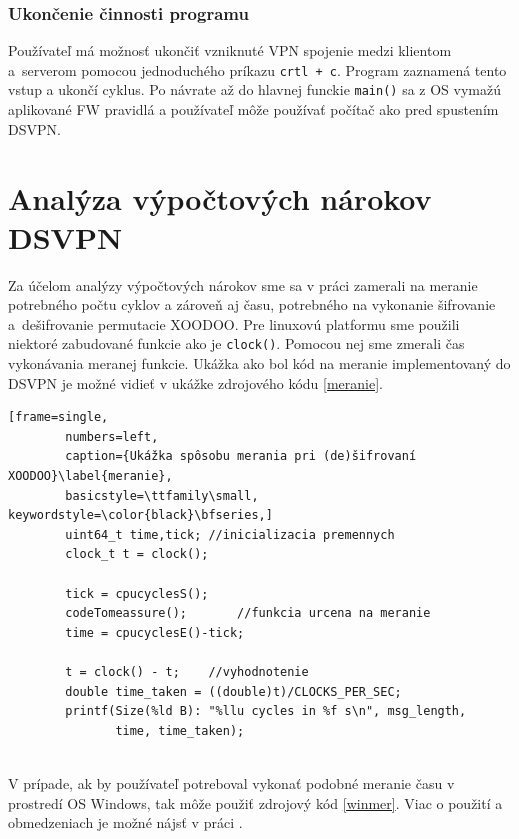   
\subsubsection{Ukončenie činnosti programu}
Používateľ má možnosť ukončiť vzniknuté VPN spojenie medzi klientom a~serverom pomocou jednoduchého príkazu \lstinline|crtl + c|. Program zaznamená tento \\vstup a ukončí cyklus. Po návrate až do hlavnej funckie \lstinline|main()| sa z OS vymažú aplikované FW pravidlá a používateľ môže používať počítač ako pred spustením DSVPN.

\section{Analýza výpočtových nárokov DSVPN}\label{analyza}
Za účelom analýzy výpočtových nárokov sme sa v práci zamerali na meranie potrebného počtu cyklov a zároveň aj času, potrebného na vykonanie šifrovanie a~dešifrovanie permutacie XOODOO. Pre linuxovú platformu sme použili niektoré zabudované funkcie ako je \lstinline|clock()|. Pomocou nej sme zmerali čas vykonávania meranej funkcie. Ukážka ako bol kód na meranie implementovaný do DSVPN je možné vidieť v ukážke zdrojového kódu \ref{meranie}.
 
\begin{minipage}{\linewidth} 	
	\begin{lstlisting}[frame=single,
		numbers=left,
		caption={Ukážka spôsobu merania pri (de)šifrovaní XOODOO}\label{meranie},
		basicstyle=\ttfamily\small, keywordstyle=\color{black}\bfseries,]
		uint64_t time,tick;	//inicializacia premennych
		clock_t t = clock();
		
		tick = cpucyclesS();
		codeTomeassure();		//funkcia urcena na meranie
		time = cpucyclesE()-tick;
		
		t = clock() - t;    //vyhodnotenie
		double time_taken = ((double)t)/CLOCKS_PER_SEC;
		printf(Size(%ld B): "%llu cycles in %f s\n", msg_length,
		       time, time_taken);	
	\end{lstlisting}
\end{minipage}\\
V prípade, ak by používateľ potreboval vykonať podobné meranie času v prostredí OS Windows, tak môže použiť zdrojový kód \ref{winmer}. Viac o použití a obmedzeniach je možné nájsť v práci \cite{bc}.

